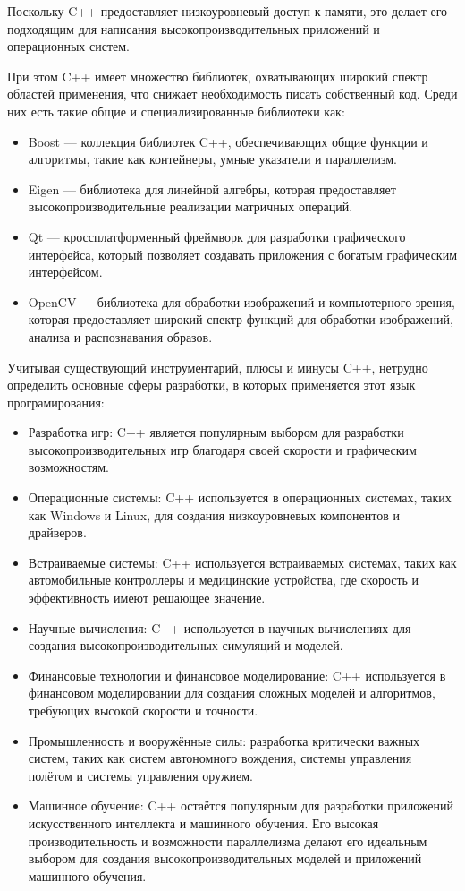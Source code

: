 Поскольку C++ предоставляет низкоуровневый доступ к памяти, это делает его подходящим для написания высокопроизводительных приложений и операционных систем.

При этом C++ имеет множество библиотек, охватывающих широкий спектр областей применения, что снижает необходимость писать собственный код. Среди них есть такие общие и специализированные библиотеки как:
\begin{itemize}
    \item Boost --- коллекция библиотек C++, обеспечивающих общие функции и алгоритмы, такие как контейнеры, умные указатели и параллелизм.
    \item Eigen --- библиотека для линейной алгебры, которая предоставляет высокопроизводительные реализации матричных операций.
    \item Qt --- кроссплатформенный фреймворк для разработки графического интерфейса, который позволяет создавать приложения с богатым графическим интерфейсом.
    \item OpenCV --- библиотека для обработки изображений и компьютерного зрения, которая предоставляет широкий спектр функций для обработки изображений, анализа и распознавания образов.
\end{itemize}

Учитывая существующий инструментарий, плюсы и минусы C++, нетрудно определить основные сферы разработки, в которых применяется этот язык програмирования:
\begin{itemize}
    \item Разработка игр: C++ является популярным выбором для разработки высокопроизводительных игр благодаря своей скорости и графическим возможностям.
    \item Операционные системы: C++ используется в операционных системах, таких как Windows и Linux, для создания низкоуровневых компонентов и драйверов.
    \item Встраиваемые системы: C++ используется встраиваемых системах, таких как автомобильные контроллеры и медицинские устройства, где скорость и эффективность имеют решающее значение.
    \item Научные вычисления: C++ используется в научных вычислениях для создания высокопроизводительных симуляций и моделей.
    \item Финансовые технологии и финансовое моделирование: C++ используется в финансовом моделировании для создания сложных моделей и алгоритмов, требующих высокой скорости и точности.
    \item Промышленность и вооружённые силы: разработка критически важных систем, таких как систем автономного вождения, системы управления полётом и системы управления оружием.
    \item Машинное обучение: C++ остаётся популярным для разработки приложений искусственного интеллекта и машинного обучения. Его высокая производительность и возможности параллелизма делают его идеальным выбором для создания высокопроизводительных моделей и приложений машинного обучения.
\end{itemize}